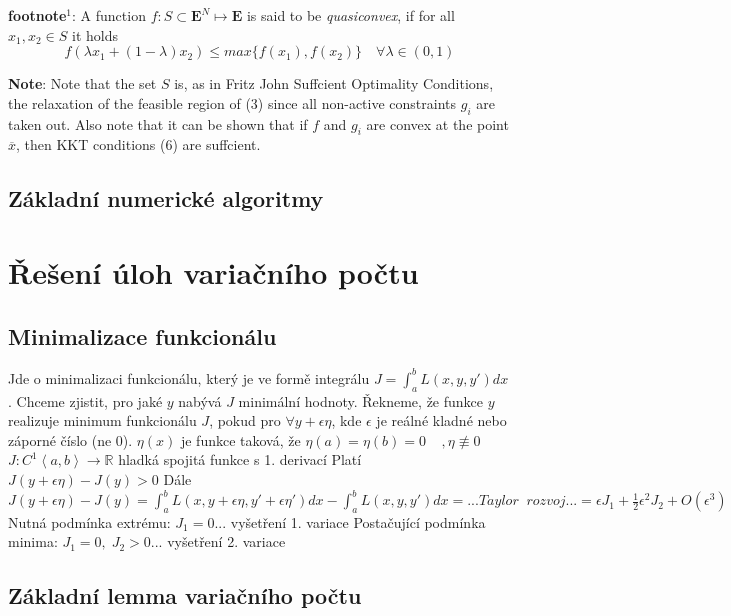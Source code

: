 {\textbf{footnote$^{1}$}: A function $f: S \subset \mathbf{E}^{N} \mapsto \mathbf{E}$ is said to be \textit{quasiconvex}, if for all 
$x_{1}, x_{2} \in S$ it holds
$$ f(\lambda x_{1} + (1-\lambda )x_{2}) \leq max\{ f(x_{1}),f(x_{2})\} \quad  \forall \lambda \in (0,1) $$

\textbf{Note}: Note that the set $S$ is, as in Fritz John Suffcient Optimality Conditions, the relaxation of the feasible region of (3)
since all non-active constraints $g_{i}$ are taken out. Also note that it can be shown that if $f$
and $g_{i}$ are convex at the point $\overline{x}$, then KKT conditions (6) are suffcient.

\subsection{Základní numerické algoritmy}


\section{Řešení úloh variačního počtu}

\subsection{Minimalizace funkcionálu}
Jde o minimalizaci funkcionálu, který je ve formě integrálu $J=\int_{a}^{b}L(x,y,{y}')dx $. Chceme zjistit, pro jaké $y$ nabývá $J$ minimální hodnoty. 
Řekneme, že funkce $y$ realizuje minimum funkcionálu $J$, pokud pro $\forall y+\epsilon \eta  $, kde $\epsilon $ je reálné kladné nebo záporné číslo (ne 0).
\newline $\eta (x)$ je funkce taková, že $\eta (a)=\eta (b)=0\; \; \; \; ,\eta \not\equiv 0$
\newline $J:C^{1}\left \langle a,b \right \rangle\rightarrow \mathbb{R}$ hladká spojitá funkce s 1. derivací
\newline Platí $J(y+\epsilon \eta )-J(y)> 0$
\newline Dále $J(y+\epsilon \eta )-J(y)=\int_{a}^{b}L(x,y+\epsilon \eta ,{y}'+\epsilon {\eta }')dx-\int_{a}^{b}L(x,y,{y}')dx=...Taylor\; \;  rozvoj...=\epsilon J_{1}+\frac{1}{2}\epsilon ^{2}J_{2}+O(\epsilon ^{3})$
\newline Nutná podmínka extrému: $J_{1}=0$... vyšetření 1. variace
\newline Postačující podmínka minima: $J_{1}=0,\; J_{2}> 0$... vyšetření 2. variace

\subsection{Základní lemma variačního počtu}

}
